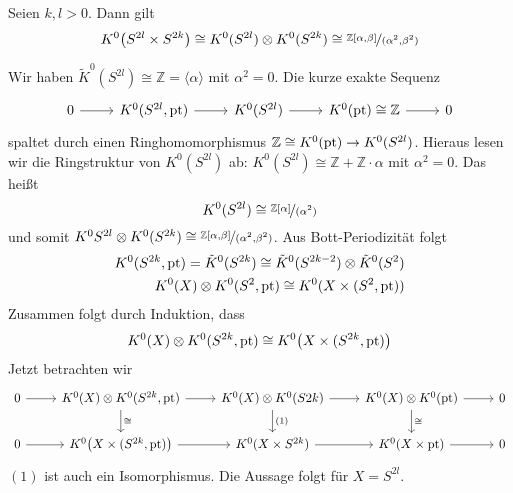 \begin{lemma}[label=sub:43]
Seien $k,l >0$. Dann gilt
\[
	K^0 \enbrace*{S^{2l} \times S^{2k}} \cong K^0(S^{2l}) \otimes K^0(S^{2k}) \cong \nicefrac{\mathds{Z}[\alpha,\beta]}{(\alpha^2,\beta^2)}
\]
\end{lemma}
\begin{beweis}
Wir haben $\tilde{K}^0(S^{2l}) \cong \mathds{Z} = \langle \alpha \rangle$ mit $\alpha^2=0$. Die kurze exakte Sequenz 
\[
	\begin{tikzcd}
		0 \rar & K^0(S^{2l},\pt) \rar & K^0(S^{2l}) \rar & K^0(\pt)\cong \mathds{Z} \rar & 0
	\end{tikzcd}
\]
spaltet durch einen Ringhomomorphismus $\mathds{Z} \cong K^0(\pt) \to K^0(S^{2l})$. Hieraus lesen wir die Ringstruktur von $K^0(S^{2l})$ ab: 
$K^0(S^{2l})\cong \mathds{Z} + \mathds{Z} \cdot \alpha $ mit $\alpha^2=0$. Das heißt 
\[
	K^0(S^{2l}) \cong \nicefrac{\mathds{Z}[\alpha]}{(\alpha^2)}
\]
und somit $K^0{S^{2l}} \otimes K^0(S^{2k}) \cong \nicefrac{\mathds{Z}[\alpha,\beta]}{(\alpha^2,\beta^2)}$. Aus Bott-Periodizität folgt 
\begin{align*}
	K^0(S^{2k},\pt) = \tilde{K}^0(S^{2k}) \cong \tilde{K}^0(S^{2k-2}) \otimes \tilde{K}^0(S^2) \\
	K^0(X) \otimes K^0(S^2,\pt) \cong K^0(X \times (S^2,\pt))
\end{align*}
Zusammen folgt durch Induktion, dass 
\[
	K^0(X) \otimes  K^0(S^{2k},\pt ) \cong K^0 \enbrace*{X \times (S^{2k},\pt)} 
\]
Jetzt betrachten wir
\[
	\begin{tikzcd}
		0 \rar & K^0(X) \otimes  K^0(S^{2k},\pt)\dar["\cong"] \rar & K^0(X) \otimes K^0(S{2k}) \dar["(1)"] \rar & K^0(X) \otimes K^0(\pt) \dar["\cong"] \rar & 0 \\
		0 \rar & K^0 \enbrace*{X \times (S^{2k},\pt)} \rar & K^0(X \times S^{2k}) \rar & K^0(X \times \pt) \rar & 0 
	\end{tikzcd}
\]
$(1)$ ist auch ein Isomorphismus. Die Aussage folgt für $X=S^{2l}$.	
\end{beweis}


